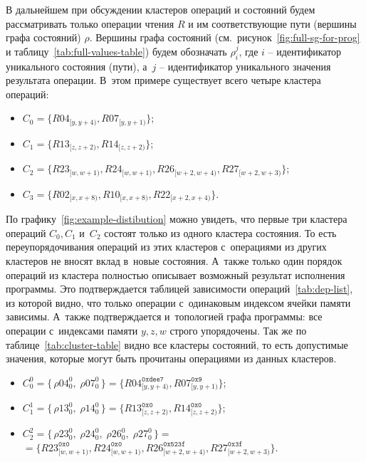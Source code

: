 В дальнейшем при обсуждении кластеров операций и состояний будем
рассматривать только операции чтения $R$ и им соответствующие пути
(вершины графа состояний) $\rho$.
Вершины графа состояний (см.~рисунок~\ref{fig:full-sg-for-prog} и
таблицу~\ref{tab:full-values-table}) будем обозначать $\rho_{i}^{j}$,
где $i$ -- идентификатор уникального состояния (пути), а~$j$ --
идентификатор уникального значения результата операции.
В~этом примере существует всего четыре кластера операций:
\begin{samepage}
  \begin{itemize}
    \item $C_0 = \{R04_{[y, y+4)}, R07_{[y, y+1)}\}$;
    \item $C_1 = \{R13_{[z, z+2)}, R14_{[z, z+2)}\}$;
    \item $C_2 = \{R23_{[w, w+1)}, R24_{[w, w+1)}, R26_{[w+2, w+4)},
      R27_{[w+2, w+3)}\}$;

    \item $C_3 = \{R02_{[x, x+8)}, R10_{[x, x+8)}, R22_{[x+2, x+4)}\}$.
  \end{itemize}
\end{samepage}

По графику~\ref{fig:example-distibution} можно увидеть, что первые
три кластера операций $C_0, C_1$ и~$C_2$ состоят только из одного
кластера состояния.
То есть переупорядочивания операций из этих кластеров с~операциями
из других кластеров не вносят вклад в~новые состояния.
А~также только один порядок операций из кластера полностью описывает
возможный результат исполнения программы.
Это подтверждается таблицей зависимости операций~\ref{tab:dep-list},
из которой видно, что только операции с~одинаковым индексом ячейки
памяти зависимы. А~также подтверждается и~топологией графа
программы: все операции с~индексами памяти $y, z, w$ строго упорядочены.
Так же по таблице~\ref{tab:cluster-table} видно все кластеры
состояний, то есть допустимые значения, которые могут быть прочитаны
операциями из данных кластеров.

\begin{samepage}
  \begin{itemize}
    \item $C_0^0 = \{\, \rho04_{0}^{0},\; \rho07_{0}^{0} \,\} =
      \{R04_{[y, y+4)}^{\texttt{0xdee7}}, R07_{[y,
      y+1)}^{\texttt{0x9}}\}$;
    \item $C_1^1 = \{\, \rho13_{0}^{0},\; \rho14_{0}^{0} \,\} =
      \{R13_{[z, z+2)}^{\texttt{0x0}}, R14_{[z,
      z+2)}^{\texttt{0x0}}\}$;
    \item $C_2^2 = \{\, \rho23_{0}^{0},\; \rho24_{0}^{0},\; \rho26_{0}^{0},\;
      \rho27_{0}^{0} \,\} = $ \\ $ = \{R23_{[w, w+1)}^{\texttt{0x0}}, R24_{[w,
        w+1)}^{\texttt{0x0}}, R26_{[w+2, w+4)}^{\texttt{0x523f}},
      R27_{[w+2, w+3)}^{\texttt{0x3f}}\}$.

  \end{itemize}
\end{samepage}

